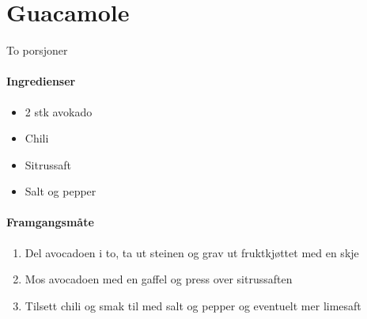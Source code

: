 \section{﻿Guacamole}
\label{guacamole}
To porsjoner

\paragraph{Ingredienser}
\begin{itemize}[noitemsep]
	\item 2 stk avokado
	\item Chili
	\item Sitrussaft
	\item Salt og pepper
\end{itemize}


\paragraph{Framgangsmåte}
\begin{enumerate}[noitemsep]
	\item Del avocadoen i to, ta ut steinen og grav ut fruktkjøttet med en skje
	\item Mos avocadoen med en gaffel og press over sitrussaften
	\item Tilsett chili og smak til med salt og pepper og eventuelt mer limesaft
\end{enumerate}
